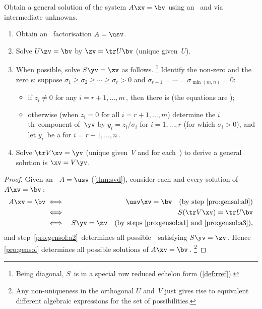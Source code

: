 \begin{procedure}\label{pro:gensol}
    Obtain a general solution of the system $A\xv=\bv$ using an \svd\ and via intermediate unknowns.
    \begin{enumerate}
    \item \label{pro:gensol:a0} Obtain an \svd\ factorisation \(A=\usv\).
        \item \label{pro:gensol:a1} Solve \(U\zv=\bv\) by $\zv=\tr U\bv$ (unique given~\(U\)).
    
        \item \label{pro:gensol:a2} When possible, solve \(S\yv=\zv\) as follows.
        \footnote{Being diagonal, \(S\)~is in a special row reduced echelon form (\autoref{def:rref}).}  
        Identify the non-zero and the zero s: suppose \(\sigma_1\geq\sigma_2\geq\cdots\geq\sigma_r>0\) and \(\sigma_{r+1}=\cdots=\sigma_{\min(m,n)}=0\):
\begin{itemize}
\item         if $z_i\neq0$ for any \(i=r+1,\ldots,m\)\,, then there is  (the equations are );
        
\item        otherwise (when \(z_i=0\) for all \(i=r+1,\ldots,m\)) determine the $i$th~component of~$\yv$ by
        $y_i=z_i/\sigma_i$ for $i=1,\ldots,r$  (for which $\sigma_i> 0$), and let $y_i$~be a  for $i=r+1,\ldots,n$\,. 

\end{itemize}
    
        \item \label{pro:gensol:a3} Solve \(\tr V\xv=\yv\) (unique given~\(V\) and for each~\yv) to derive a general solution is $\xv=V\yv$.
    \end{enumerate}
\end{procedure}

\begin{proof} 
Given an \svd\ \(A=\usv\) (\autoref{thm:svd}), consider each and every solution of \(A\xv=\bv\)\,:
\begin{eqnarray*}
A\xv=\bv
  &\iff& \usv\xv=\bv \quad\text{(by step~\ref{pro:gensol:a0})}
\\&\iff& S(\tr V\xv)=\tr U\bv
\\&\iff& S\yv=\zv\quad\text{(by steps~\ref{pro:gensol:a1} and~\ref{pro:gensol:a3}),}
\end{eqnarray*}
and step~\ref{pro:gensol:a2}\ determines all possible~\yv\ satisfying \(S\yv=\zv\)\,.
Hence \autoref{pro:gensol} determines all possible solutions of \(A\xv=\bv\)\,.%
\footnote{Any non-uniqueness in the orthogonal \(U\) and~\(V\) just gives rise to equivalent different algebraic expressions for the set of possibilities.}
\end{proof}




